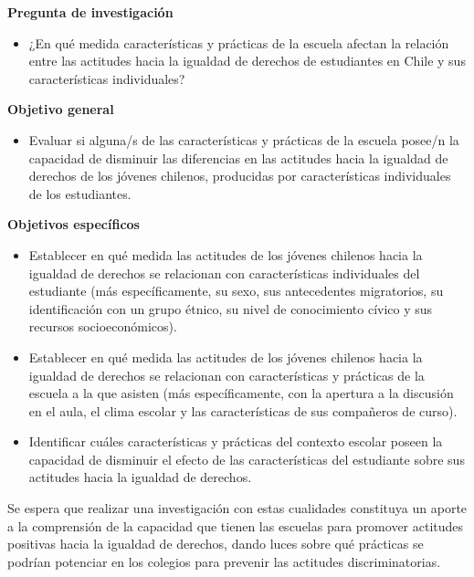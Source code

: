 \documentclass[12pt,twoside]{templates/facsothesis}
\providecommand{\tightlist}{%
  \setlength{\itemsep}{0pt}\setlength{\parskip}{0pt}}
\begin{document}
\textbf{Pregunta de investigación}

\begin{itemize}
\tightlist
\item
  ¿En qué medida características y prácticas de la escuela afectan la relación entre las actitudes hacia la igualdad de derechos de estudiantes en Chile y sus características individuales?
\end{itemize}

\textbf{Objetivo general}

\begin{itemize}
\tightlist
\item
  Evaluar si alguna/s de las características y prácticas de la escuela posee/n la capacidad de disminuir las diferencias en las actitudes hacia la igualdad de derechos de los jóvenes chilenos, producidas por características individuales de los estudiantes.
\end{itemize}

\textbf{Objetivos específicos}

\begin{itemize}
\item
  Establecer en qué medida las actitudes de los jóvenes chilenos hacia la igualdad de derechos se relacionan con características individuales del estudiante (más específicamente, su sexo, sus antecedentes migratorios, su identificación con un grupo étnico, su nivel de conocimiento cívico y sus recursos socioeconómicos).
\item
  Establecer en qué medida las actitudes de los jóvenes chilenos hacia la igualdad de derechos se relacionan con características y prácticas de la escuela a la que asisten (más específicamente, con la apertura a la discusión en el aula, el clima escolar y las características de sus compañeros de curso).
\item
  Identificar cuáles características y prácticas del contexto escolar poseen la capacidad de disminuir el efecto de las características del estudiante sobre sus actitudes hacia la igualdad de derechos.
\end{itemize}

Se espera que realizar una investigación con estas cualidades constituya un aporte a la comprensión de la capacidad que tienen las escuelas para promover actitudes positivas hacia la igualdad de derechos, dando luces sobre qué prácticas se podrían potenciar en los colegios para prevenir las actitudes discriminatorias.
\end{document}
